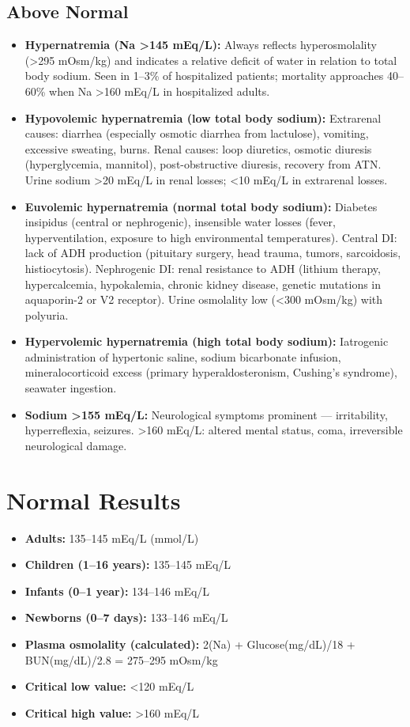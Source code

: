 \subsection*{Above Normal}
\begin{itemize}
  \item \textbf{Hypernatremia (Na >145 mEq/L):} Always reflects hyperosmolality (>295 mOsm/kg) and indicates a relative deficit of water in relation to total body sodium. Seen in 1--3\% of hospitalized patients; mortality approaches 40--60\% when Na >160 mEq/L in hospitalized adults.
  \item \textbf{Hypovolemic hypernatremia (low total body sodium):} Extrarenal causes: diarrhea (especially osmotic diarrhea from lactulose), vomiting, excessive sweating, burns. Renal causes: loop diuretics, osmotic diuresis (hyperglycemia, mannitol), post-obstructive diuresis, recovery from ATN. Urine sodium >20 mEq/L in renal losses; <10 mEq/L in extrarenal losses.
  \item \textbf{Euvolemic hypernatremia (normal total body sodium):} Diabetes insipidus (central or nephrogenic), insensible water losses (fever, hyperventilation, exposure to high environmental temperatures). Central DI: lack of ADH production (pituitary surgery, head trauma, tumors, sarcoidosis, histiocytosis). Nephrogenic DI: renal resistance to ADH (lithium therapy, hypercalcemia, hypokalemia, chronic kidney disease, genetic mutations in aquaporin-2 or V2 receptor). Urine osmolality low (<300 mOsm/kg) with polyuria.
  \item \textbf{Hypervolemic hypernatremia (high total body sodium):} Iatrogenic administration of hypertonic saline, sodium bicarbonate infusion, mineralocorticoid excess (primary hyperaldosteronism, Cushing's syndrome), seawater ingestion.
  \item \textbf{Sodium >155 mEq/L:} Neurological symptoms prominent --- irritability, hyperreflexia, seizures. >160 mEq/L: altered mental status, coma, irreversible neurological damage.
\end{itemize}

\section*{Normal Results}
\begin{itemize}
  \item \textbf{Adults:} 135--145 mEq/L (mmol/L)
  \item \textbf{Children (1--16 years):} 135--145 mEq/L
  \item \textbf{Infants (0--1 year):} 134--146 mEq/L
  \item \textbf{Newborns (0--7 days):} 133--146 mEq/L
  \item \textbf{Plasma osmolality (calculated):} 2(Na) + Glucose(mg/dL)/18 + BUN(mg/dL)/2.8 = 275--295 mOsm/kg
  \item \textbf{Critical low value:} <120 mEq/L
  \item \textbf{Critical high value:} >160 mEq/L
\end{itemize}

